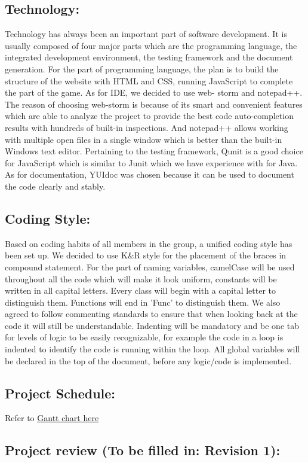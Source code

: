 \documentclass{article}
\begin{document}
\subsection*{Technology:} 
Technology has always been an important part of
software development. It is usually composed of four major parts which are the
programming language, the integrated development environment, the testing
framework and the document generation. For the part of programming language, the
plan is to build the structure of the website with HTML and CSS, running
JavaScript to complete the part of the game. As for IDE, we decided to use web-
storm and notepad++. The reason of choosing web-storm is because of its smart
and convenient features which are able to analyze the project to provide the
best code auto-completion results with hundreds of built-in inspections. And
notepad++ allows working with multiple open files in a single window which is
better than the built-in Windows text editor. Pertaining to the testing framework,
Qunit is a good choice for JavaScript which is similar to Junit which we have
experience with for Java. As for documentation, YUIdoc was chosen because it
can be used to document the code clearly and stably.

\subsection*{Coding Style:}  
Based on coding habits of all members in the
group, a unified coding style has been set up. We decided to use K\&R style for
the placement of the braces in compound statement. For the part of naming
variables, camelCase will be used throughout all the code which will make it
look uniform, constants will be written in all capital letters. Every class will
begin with a capital letter to distinguish them. Functions will end in 'Func' to
distinguish them. We also agreed to follow commenting standards to ensure that
when looking back at the code it will still be understandable. Indenting will be
mandatory and be one tab for levels of logic to be easily recognizable, for
example the code in a loop is indented to identify the code is running within
the loop. All global variables will be declared in the top of the document,
before any logic/code is implemented.

\subsection*{Project Schedule:} Refer to  
\href{https://gitlab.cas.mcmaster.ca/pathmap/JSTanks/tree/master/ProjectSchedule}
{Gantt chart here}

\subsection*{Project review (To be filled in: Revision 1):}
\end{document}
